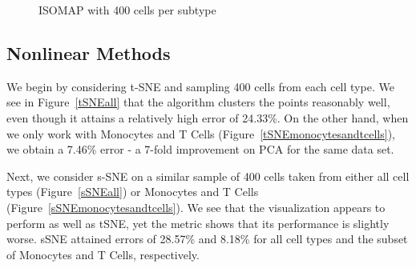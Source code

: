 \documentclass{article}
\begin{document}
\begin{figure}[h]
\vskip 0.2in
\begin{center}
\quad
{}\quad
\end{center}
\caption{ISOMAP with 400 cells per subtype}
\label{isomaps}
\vskip -0.2in
\end{figure}

\subsection{Nonlinear Methods}
We begin by considering t-SNE and sampling 400 cells from each cell type. We see in Figure~\ref{tSNEall} that the algorithm clusters the points reasonably well, even though it attains a relatively high error of 24.33\%. On the other hand, when we only work with Monocytes and T Cells (Figure~\ref{tSNEmonocytesandtcells}), we obtain a 7.46\% error - a 7-fold improvement on PCA for the same data set. 

Next, we consider s-SNE on a similar sample of 400 cells taken from either all cell types (Figure~\ref{sSNEall})  or  Monocytes and T Cells (Figure~\ref{sSNEmonocytesandtcells}). We see that the visualization appears to perform as well as tSNE, yet the metric shows that its performance is slightly worse. sSNE attained errors of 28.57\% and 8.18\% for all cell types and the subset of Monocytes and T Cells, respectively.  
\end{document}
